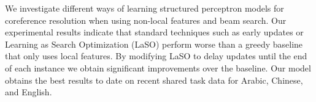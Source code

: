 We investigate different ways of learning structured perceptron models for coreference resolution when using non-local features and beam search. Our experimental results indicate that standard techniques such as early updates or Learning as Search Optimization (LaSO) perform worse than a greedy baseline that only uses local features. By modifying LaSO to delay updates until the end of each instance we obtain significant improvements over the baseline. Our model obtains the best results to date on recent shared task data for Arabic, Chinese, and English.
